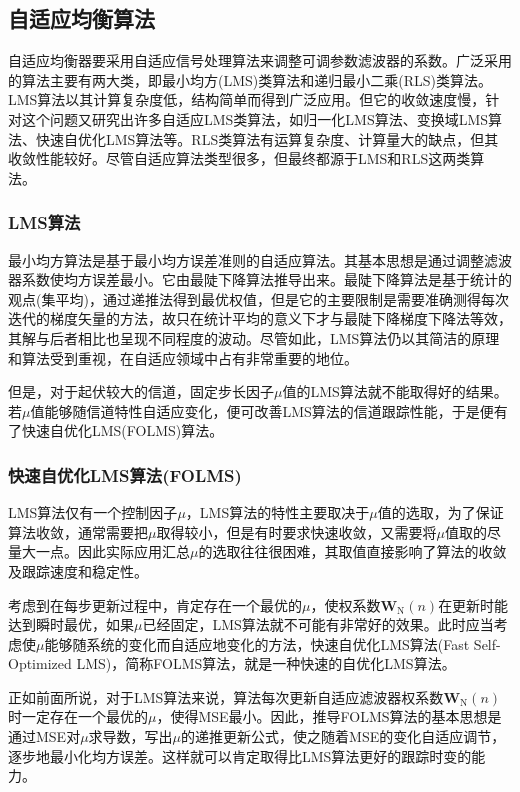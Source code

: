 \subsection{自适应均衡算法}
自适应均衡器要采用自适应信号处理算法来调整可调参数滤波器的系数。广泛采用的算法主要有两大类\citep{Simon2001}，即最小均方(LMS)类算法和递归最小二乘(RLS)类算法。LMS算法以其计算复杂度低，结构简单而得到广泛应用。但它的收敛速度慢，针对这个问题又研究出许多自适应LMS类算法，如归一化LMS算法、变换域LMS算法、快速自优化LMS算法等。RLS类算法有运算复杂度、计算量大的缺点，但其收敛性能较好。尽管自适应算法类型很多，但最终都源于LMS和RLS这两类算法。

\subsubsection*{LMS算法}

最小均方算法是基于最小均方误差准则的自适应算法。其基本思想是通过调整滤波器系数使均方误差最小。它由最陡下降算法推导出来。最陡下降算法是基于统计的观点(集平均)，通过递推法得到最优权值，但是它的主要限制是需要准确测得每次迭代的梯度矢量的方法\citep{Simon2001}，故只在统计平均的意义下才与最陡下降梯度下降法等效，其解与后者相比也呈现不同程度的波动。尽管如此，LMS算法仍以其简洁的原理和算法受到重视，在自适应领域中占有非常重要的地位。

但是，对于起伏较大的信道，固定步长因子$\mu$值的LMS算法就不能取得好的结果。若$\mu$值能够随信道特性自适应变化，便可改善LMS算法的信道跟踪性能，于是便有了快速自优化LMS(FOLMS)算法。
\subsubsection*{快速自优化LMS算法(FOLMS)}
LMS算法仅有一个控制因子$\mu$，LMS算法的特性主要取决于$\mu$值的选取，为了保证算法收敛，通常需要把$\mu$取得较小，但是有时要求快速收敛，又需要将$\mu$值取的尽量大一点。因此实际应用汇总$\mu$的选取往往很困难，其取值直接影响了算法的收敛及跟踪速度和稳定性。

考虑到在每步更新过程中，肯定存在一个最优的$\mu$，使权系数$\mathbf{W}_{\mathrm{N}}(n)$在更新时能达到瞬时最优，如果$\mu$已经固定，LMS算法就不可能有非常好的效果。此时应当考虑使$\mu$能够随系统的变化而自适应地变化的方法，快速自优化LMS算法(Fast
Self-Optimized
LMS)，简称FOLMS算法，就是一种快速的自优化LMS算法\citep{Bragard1990,George1999,Benveniste1990}。

正如前面所说，对于LMS算法来说，算法每次更新自适应滤波器权系数$\mathbf{W}_{\mathrm{N}}(n)$时一定存在一个最优的$\mu$，使得MSE最小。因此，推导FOLMS算法的基本思想是通过MSE对$\mu$求导数，写出$\mu$的递推更新公式，使之随着MSE的变化自适应调节，逐步地最小化均方误差。这样就可以肯定取得比LMS算法更好的跟踪时变的能力。
